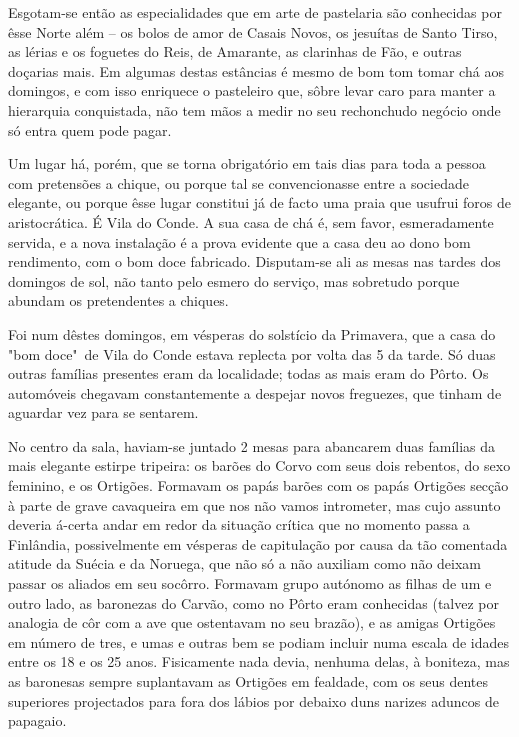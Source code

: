 \documentclass[9pt]{article}
\begin{document}
Esgotam-se então as especialidades que em arte de pastelaria são
conhecidas por êsse Norte além -- os bolos de amor de Casais Novos, os jesuítas de Santo Tirso, as lérias e os foguetes do Reis, de Amarante, as
clarinhas de Fão, e outras doçarias mais. Em algumas destas es\-tân\-cias é mesmo de
bom tom tomar chá aos domingos, e com isso enriquece o pasteleiro que,
sôbre levar caro para manter a hierarquia conquistada, não tem mãos a
medir no seu rechonchudo negócio onde só entra quem pode pagar.

Um lugar há, porém, que se torna obrigatório em tais dias para toda
a pessoa com pretensões a chique, ou porque tal se convencionasse entre
a sociedade elegante, ou porque êsse lugar constitui já de facto uma
praia que usufrui foros de aristocrática. É Vila do Conde. A sua
casa de chá é, sem favor, esmeradamente servida, e a nova instala\-ção é a prova
evidente que a casa deu ao dono bom rendimento, com o bom doce fabricado.
Disputam-se ali as mesas nas tardes dos domingos de sol, não tanto pelo
esmero do serviço, mas sobretudo porque abundam os pretendentes a
chiques.

Foi num dêstes domingos, em vésperas do solstício da Primavera, que
a casa do "bom doce"\ de Vila do Conde estava replecta por volta das 5
da tarde. Só duas outras fa\-mí\-lias presentes eram da localidade; todas
as mais eram do Pôrto. Os automóveis chegavam constantemente a despejar
novos freguezes, que tinham de aguardar vez para se sentarem.

No centro da sala, haviam-se juntado 2 mesas para abancarem duas
fa\-mí\-lias da mais elegante estirpe tripeira: os barões do Corvo com
seus dois rebentos, do sexo feminino, e os Ortigões. Formavam os papás
barões com os papás Ortigões sec\-ção à parte de grave cavaqueira em que
nos não vamos intrometer, mas cujo assunto deveria á-certa andar em redor da situa\-ção crítica que no momento passa a Finlândia, possivelmente
em vésperas de capitula\-ção por causa da tão comentada atitude da Suécia
e da Noruega, que não só a não auxiliam como não deixam passar os aliados em seu socôrro. Formavam grupo autónomo as fi\-lhas de um e outro lado, as baronezas do Carvão, como no Pôrto eram conhecidas (talvez por
analogia de côr com a ave que ostentavam no seu brazão), e as amigas
Ortigões em número de tres, e umas e outras bem se podiam incluir numa escala de idades
entre os 18 e os 25 anos. Fisicamente nada devia, nenhuma delas, à boniteza, mas as baronesas sempre suplantavam as Ortigões em fealdade, com os seus dentes superiores projectados para fora dos lábios
por debaixo duns narizes aduncos de papagaio.
\end{document}

